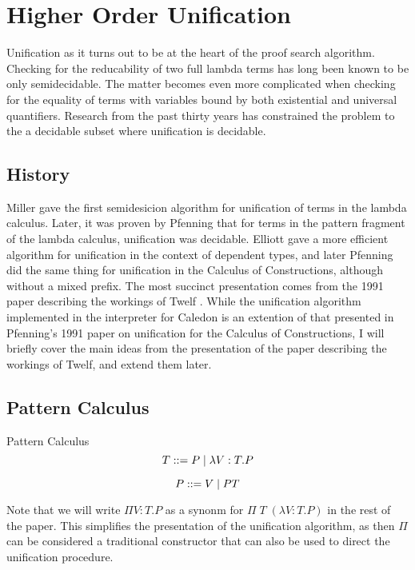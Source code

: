 \section{Higher Order Unification}

Unification as it turns out to be at the heart of the proof search algorithm.  Checking for the 
reducability of two full lambda terms has long been known to be only semidecidable.  
The matter becomes even more complicated when checking for the equality of terms with variables bound
by both existential and universal quantifiers.  Research from the past thirty years has constrained
the problem to the a decidable subset where unification is decidable. 


\subsection{History}

Miller \citep{miller1986higher} gave the first semidesicion algorithm for unification of 
terms in the lambda calculus.  
Later, it was proven by Pfenning \citep{pfenning1988partial} \citep{pfenning1988higher} 
that for terms in the pattern fragment of the lambda calculus, unification was decidable.  
Elliott\citep{elliott1989higher} gave a more efficient algorithm for unification in the context 
of dependent types, and later Pfenning \citep{pfenning1991unification}
did the same thing for unification in the Calculus of Constructions, although without a mixed prefix.  
The most succinct presentation comes from the 1991 paper describing the workings of Twelf 
\citep{pfenning1991logic}.  While the unification algorithm implemented in the interpreter for Caledon is 
an extention of that presented in Pfenning's 1991 paper on unification for 
the Calculus of Constructions\citep{pfenning1991unification}, 
I will briefly cover the main ideas from the presentation of the paper describing the workings of Twelf, 
and extend them later.

\subsection{Pattern Calculus}

\begin{definition}
Pattern Calculus
\[
T ::= P
   \; | \; \lambda V : T . P 
\]

\[
P ::= V 
  \; | \; P T 
\]
\end{definition}

Note that we will write $\Pi V : T . P$ as a synonm for $\Pi\; T \; (\lambda V : T . P)$ in the rest of the paper.
This simplifies the presentation of the unification algorithm, as then $\Pi$ can be considered a traditional constructor
that can also be used to direct the unification procedure.

